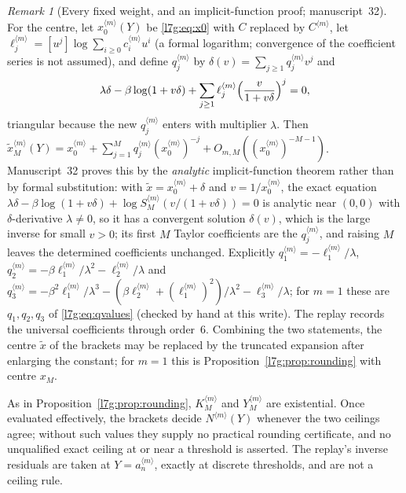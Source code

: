 \documentclass[11pt,letterpaper]{article}
\theoremstyle{remark}\newtheorem{remark}[theorem]{Remark}
\newcounter{l7gtrsavedeq}
\begin{document}
\begin{remark}[Every fixed weight, and an implicit-function proof; manuscript~32]
For the centre, let $x_0^{\langle m\rangle}(Y)$ be \eqref{l7g:eq:x0} with $C$
replaced by $C^{\langle m\rangle}$, let
$\ell_j^{\langle m\rangle}=[u^j]\log\sum_{i\ge0}c_i^{\langle m\rangle}u^i$
(a formal logarithm; convergence of the coefficient series is not assumed),
and define $q_j^{\langle m\rangle}$ by
$\delta(v)=\sum_{j\ge1}q_j^{\langle m\rangle}v^j$ and
\[
 \lambda\delta-\beta\log(1+v\delta)
 +\sum_{j\ge1}\ell_j^{\langle m\rangle}\Bigl(\frac{v}{1+v\delta}\Bigr)^j=0,
\]
triangular because the new $q_j^{\langle m\rangle}$ enters with
multiplier $\lambda$. Then
$\tilde x_M^{\langle m\rangle}(Y)=x_0^{\langle m\rangle}
+\sum_{j=1}^{M}q_j^{\langle m\rangle}(x_0^{\langle m\rangle})^{-j}
+O_{m,M}((x_0^{\langle m\rangle})^{-M-1})$. Manuscript~32 proves this by the
\emph{analytic} implicit-function theorem rather than by formal
substitution: with $\tilde x=x_0^{\langle m\rangle}+\delta$ and
$v=1/x_0^{\langle m\rangle}$, the exact equation
$\lambda\delta-\beta\log(1+v\delta)+\log S_M^{\langle m\rangle}(v/(1+v\delta))=0$
is analytic near $(0,0)$ with $\delta$-derivative $\lambda\ne0$, so it has a
convergent solution $\delta(v)$, which is the large inverse for small $v>0$;
its first $M$ Taylor coefficients are the $q_j^{\langle m\rangle}$, and
raising $M$ leaves the determined coefficients unchanged. Explicitly
$q_1^{\langle m\rangle}=-\ell_1^{\langle m\rangle}/\lambda$,
$q_2^{\langle m\rangle}=-\beta\ell_1^{\langle m\rangle}/\lambda^2
-\ell_2^{\langle m\rangle}/\lambda$ and
$q_3^{\langle m\rangle}=-\beta^2\ell_1^{\langle m\rangle}/\lambda^3
-(\beta\ell_2^{\langle m\rangle}+(\ell_1^{\langle m\rangle})^2)/\lambda^2
-\ell_3^{\langle m\rangle}/\lambda$; for $m=1$ these are $q_1,q_2,q_3$ of
\eqref{l7g:eq:qvalues} (checked by hand at this write). The
replay records the universal coefficients through order~$6$. Combining the
two statements, the centre $\tilde x$ of the brackets may be replaced by the
truncated expansion after enlarging the constant; for $m=1$ this is
Proposition~\ref{l7g:prop:rounding} with centre $x_M$.

As in Proposition~\ref{l7g:prop:rounding}, $K_M^{\langle m\rangle}$ and
$Y_M^{\langle m\rangle}$ are existential. Once evaluated effectively, the
brackets decide $N^{\langle m\rangle}(Y)$ whenever the two ceilings agree;
without such values they supply no practical rounding certificate, and no
unqualified exact ceiling at or near a threshold is asserted. The replay's
inverse residuals are taken at $Y=a_n^{\langle m\rangle}$, exactly at
discrete thresholds, and are not a ceiling rule.
\end{remark}
\end{document}
